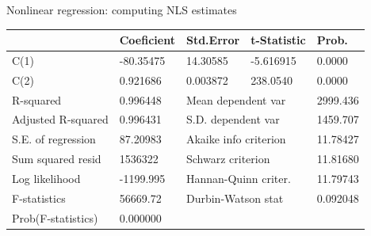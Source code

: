 \documentclass{beamer}
\begin{document}
\begin{frame}{Nonlinear regression: computing NLS estimates}
\begin{table}[]
\begin{tabular}{@{}lllll@{}}
                                                           & Coeficient                                         & Std.Error                                         & t-Statistic                                        & Prob.                                           \\
\midrule
C(1)                                                       & -80.35475                                          & 14.30585                                          & -5.616915                                          & 0.0000                                          \\
C(2)                                                       & 0.921686                                           & 0.003872                                          & 238.0540                                           & 0.0000 
\\ \midrule
R-squared                                                  & 0.996448                                           & \multicolumn{2}{l}{Mean dependent var}                                                                 & 2999.436                                        \\
Adjusted R-squared                                         & 0.996431                                           & \multicolumn{2}{l}{S.D. dependent var}                                                                 & 1459.707                                        \\
S.E. of regression                                         & 87.20983                                           & \multicolumn{2}{l}{Akaike info criterion}                                                              & 11.78427                                        \\
Sum squared resid                                          & 1536322                                            & \multicolumn{2}{l}{Schwarz criterion}                                                                  & 11.81680                                        \\
Log likelihood                                             & -1199.995                                          & \multicolumn{2}{l}{Hannan-Quinn criter.}                                                               & 11.79743                                        \\
F-statistics                                               & 56669.72                                           & \multicolumn{2}{l}{Durbin-Watson stat}                                                                 & 0.092048                                        \\
Prob(F-statistics)                                         & 0.000000                                           & \multicolumn{2}{l}{}                                                                                   &                                                 \\ \bottomrule
\end{tabular}
\end{table}
\end{frame}
\end{document}
